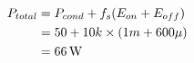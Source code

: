 \subsection{}


\begin{align*}
P_{total} & = P_{cond} + f_s (E_{on}+E_{off}) \\
          & = 50 + 10k \times (1m + 600\mu) \\
          & = \unit[66]{W}
\end{align*}
